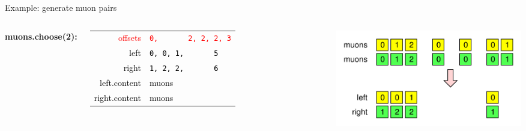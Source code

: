 \documentclass[aspectratio=169]{beamer}
\begin{document}
\begin{frame}{Example: generate muon pairs}
\begin{columns}
\vspace{0.75 cm}
{\large\bf muons.choose(2):}

\vspace{0.2 cm}
\begin{tabular}{r l}
\textcolor{red}{offsets} &   \textcolor{red}{\tt 0,\ \ \ \ \ \ \ 2,\ 2,\ 2,\ 3} \\
\textcolor{black}{left}  & \textcolor{black}{\tt 0,\ 0,\ 1,\ \ \ \ \ \ \ 5} \\
\textcolor{black}{right} & \textcolor{black}{\tt 1,\ 2,\ 2,\ \ \ \ \ \ \ 6} \\
\textcolor{black}{left.content}  & \textcolor{black}{muons} \\
\textcolor{black}{right.content} & \textcolor{black}{muons} \\
\end{tabular}

\vspace{-3.2 cm}
\hfill\includegraphics[height=3.5 cm]{muons-choose-2.pdf}

\end{columns}
\end{frame}






\begin{frame}{}
\end{frame}
\end{document}
